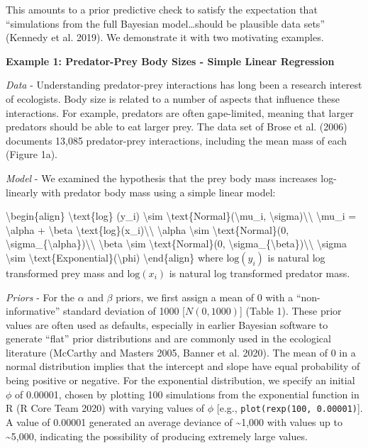 \documentclass[
  12pt,
]{article}
\begin{document}
This amounts to a prior predictive check to satisfy the expectation that
``simulations from the full Bayesian model\ldots should be plausible
data sets'' (Kennedy et al. 2019). We demonstrate it with two motivating
examples.

\textbf{Example 1: Predator-Prey Body Sizes - Simple Linear Regression}

\emph{Data} - Understanding predator-prey interactions has long been a
research interest of ecologists. Body size is related to a number of
aspects that influence these interactions. For example, predators are
often gape-limited, meaning that larger predators should be able to eat
larger prey. The data set of Brose et al. (2006) documents 13,085
predator-prey interactions, including the mean mass of each (Figure 1a).

\emph{Model} - We examined the hypothesis that the prey body mass
increases log-linearly with predator body mass using a simple linear
model:

\textbackslash begin\{align\} \textbackslash text\{log\} (y\_i)
\textbackslash sim \textbackslash text\{Normal\}(\textbackslash mu\_i,
\textbackslash sigma)\textbackslash\textbackslash{} \textbackslash mu\_i
= \textbackslash alpha + \textbackslash beta
\textbackslash text\{log\}(x\_i)\textbackslash\textbackslash{}
\textbackslash alpha \textbackslash sim \textbackslash text\{Normal\}(0,
\textbackslash sigma\_\{\textbackslash alpha\})\textbackslash\textbackslash{}
\textbackslash beta \textbackslash sim \textbackslash text\{Normal\}(0,
\textbackslash sigma\_\{\textbackslash beta\})\textbackslash\textbackslash{}
\textbackslash sigma \textbackslash sim
\textbackslash text\{Exponential\}(\textbackslash phi)
\textbackslash end\{align\} where \(\text{log}(y_i)\) is natural log
transformed prey mass and \(\text{log}(x_i)\) is natural log transformed
predator mass.

\emph{Priors} - For the \(\alpha\) and \(\beta\) priors, we first assign
a mean of 0 with a ``non-informative'' standard deviation of 1000
{[}\(N(0, 1000)\){]} (Table 1). These prior values are often used as
defaults, especially in earlier Bayesian software to generate ``flat''
prior distributions and are commonly used in the ecological literature
(McCarthy and Masters 2005, Banner et al. 2020). The mean of 0 in a
normal distribution implies that the intercept and slope have equal
probability of being positive or negative. For the exponential
distribution, we specify an initial \(\phi\) of 0.00001, chosen by
plotting 100 simulations from the exponential function in R (R Core Team
2020) with varying values of \(\phi\) {[}e.g.,
\texttt{plot(rexp(100,\ 0.00001)}{]}. A value of 0.00001 generated an
average deviance of \textasciitilde1,000 with values up to
\textasciitilde5,000, indicating the possibility of producing extremely
large values.
\end{document}
